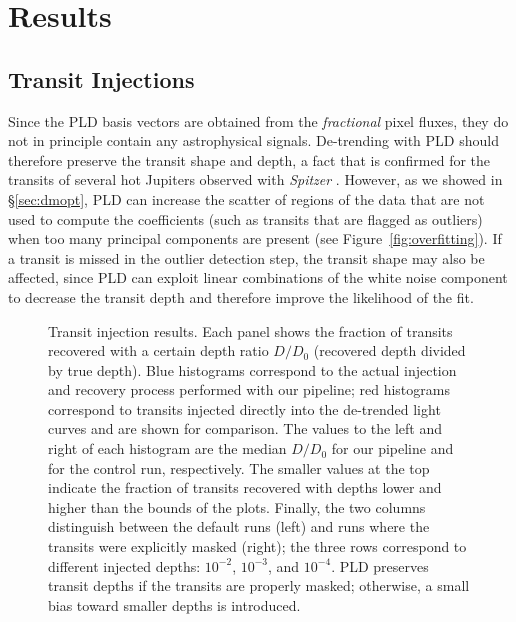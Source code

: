 \documentclass[]{emulateapj}
\begin{document}
\section{Results}
\label{sec:results}
\subsection{Transit Injections}
\label{sec:injections}
Since the PLD basis vectors are obtained from the \emph{fractional} pixel fluxes,
they do not in principle contain any astrophysical signals. De-trending with PLD
should therefore preserve the transit shape and depth, a fact that is confirmed
for the transits of several hot Jupiters observed with \emph{Spitzer} \citep{DEM15}.
However, as we showed in \S\ref{sec:dmopt}, PLD can increase the
scatter of regions of the data that are not used to compute the coefficients
(such as transits that are flagged as outliers) when too many principal components 
are present (see Figure~\ref{fig:overfitting}). If a transit is missed in the
outlier detection step, the transit shape may also be affected,
since PLD can exploit linear combinations of the white noise component
to decrease the transit depth and therefore improve the likelihood of the fit.

\begin{figure}[h]
  \begin{center}
       \caption{Transit injection results. Each panel shows the fraction of transits
                recovered with a certain depth ratio $D/D_0$ (recovered depth divided
                by true depth). Blue histograms correspond to the actual injection
                and recovery process performed with our pipeline; red histograms
                correspond to transits injected directly into the de-trended
                light curves and are shown for comparison. The values to the left
                and right of each histogram are the median $D/D_0$ for our pipeline
                and for the control run, respectively. The smaller values at the
                top indicate the fraction of transits recovered with depths lower and
                higher than the bounds of the plots. Finally, the two columns distinguish
                between the default runs (left) and runs
                where the transits were explicitly masked (right); the three rows correspond to different
                injected depths: $10^{-2}$, $10^{-3}$, and $10^{-4}$. PLD preserves
                transit depths if the transits are properly masked; otherwise, a small bias
                toward smaller depths is introduced.}
     \label{fig:injections}
  \end{center}
\end{figure}
\end{document}

